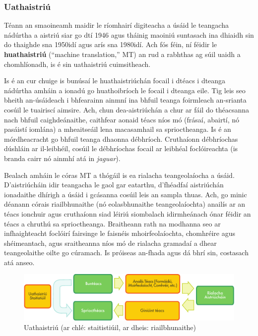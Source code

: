 \begin{multicols}{2}
\subsubsection{Uathaistriú}

Téann an smaoineamh maidir le ríomhairí digiteacha a úsáid le teangacha nádúrtha a aistriú siar go dtí 1946 agus tháinig maoiniú suntasach ina dhiaidh sin do thaighde sna 1950idí agus arís sna 1980idí. Ach fós féin, ní féidir le \textbf{huathaistriú} (``machine translation,'' MT) an rud a rabhthas ag súil uaidh a chomhlíonadh, is é sin uathaistriú cuimsitheach. 


Is é an cur chuige is bunúsaí le huathaistriúchán focail i dtéacs i dteanga nádúrtha amháin a ionadú go huathoibríoch le focail i dteanga eile. Tig leis seo bheith an-úsáideach i bhfearainn ainmní ina bhfuil teanga foirmleach an-srianta cosúil le tuairiscí aimsire. Ach, chun dea-aistriúchán a chur ar fáil do théacsanna nach bhfuil caighdeánaithe, caithfear aonaid téacs níos mó (frásaí, abairtí, nó pasáistí iomlána) a mheaitseáil lena macasamhail sa sprioctheanga. Is é an mórdheacracht go bhfuil teanga dhaonna débhríoch. Cruthaíonn débhríochas dúshláin ar il-leibhéil, cosúil le débhríochas focail ar leibhéal foclóireachta (is branda cairr nó ainmhí atá in \textit{jaguar}).

Bealach amháin le córas MT a thógáil is ea rialacha teangeolaíocha a úsáid. D’aistriúcháin idir teangacha le gaol gar eatarthu, d’fhéadfaí aistriúchán ionadaithe dhírigh a úsáid i gcásanna cosúil leis an sampla thuas. Ach, go minic déanann córais riailbhunaithe (nó eolasbhunaithe teangeolaíochta) anailís ar an téacs ionchuir agus cruthaíonn siad léiriú siombalach idirmheánach ónar féidir an téacs a chruthú sa sprioctheanga. Braitheann rath na modhanna seo ar infhaighteacht foclóirí fairsinge le faisnéis mhoirfeolaíochta, chomhréire agus shéimeantach, agus sraitheanna níos mó de rialacha gramadaí a dhear teangeolaithe oilte go cúramach. Is próiseas an-fhada agus dá bhrí sin, costasach atá anseo.

\begin{figure}[htb]
  \center
  \includegraphics[width=\textwidth]{../_media/irish/machine_translation}
  \caption{Uathaistriú (ar chlé: staitistiúil, ar dheis: riailbhunaithe)}
  \label{fig:mtarch_de}
\end{figure}


\end{multicols}
